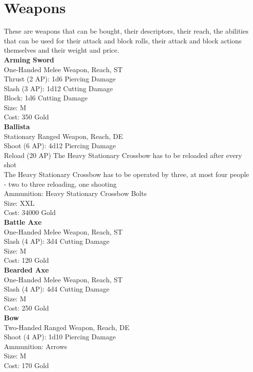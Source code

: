 \section{Weapons}
These are weapons that can be bought, their descriptors, their reach, the abilities that can be used for their attack and block rolls, their attack and block actions themselves and their weight and price.\\


\textbf{Arming Sword}\\
One-Handed Melee Weapon,  Reach, ST\\
Thrust (2 AP): 1d6 Piercing Damage\\
Slash (3 AP): 1d12 Cutting Damage\\
Block: 1d6 Cutting Damage\\
Size: M\\
Cost: 350 Gold\\


\textbf{Ballista}\\
Stationary Ranged Weapon,  Reach, DE\\
Shoot (6 AP): 4d12 Piercing Damage\\
Reload (20 AP) The Heavy Stationary Crossbow has to be reloaded after every shot\\
The Heavy Stationary Crossbow has to be operated by three, at most four people - two to three reloading, one shooting\\
Ammunition: Heavy Stationary Crossbow Bolts\\
Size: XXL\\
Cost: 34000 Gold\\


\textbf{Battle Axe}\\
One-Handed Melee Weapon,  Reach, ST\\
Slash (4 AP): 3d4 Cutting Damage\\
Size: M\\
Cost: 120 Gold\\


\textbf{Bearded Axe}\\
One-Handed Melee Weapon,  Reach, ST\\
Slash (4 AP): 4d4 Cutting Damage\\
Size: M\\
Cost: 250 Gold\\


\textbf{Bow}\\
Two-Handed Ranged Weapon,  Reach, DE\\
Shoot (4 AP): 1d10 Piercing Damage\\
Ammunition: Arrows\\
Size: M\\
Cost: 170 Gold\\


